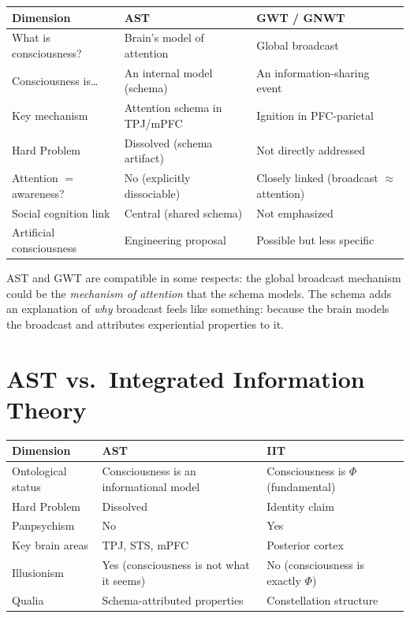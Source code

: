 \documentclass[11pt,a4paper]{report}
\begin{document}
\begin{compbox}
\renewcommand{\arraystretch}{1.4}
\begin{tabular}{>{\raggedright}p{3cm} >{\raggedright}p{5.2cm} >{\raggedright\arraybackslash}p{4.8cm}}
  \toprule
  \textbf{Dimension} & \textbf{AST} & \textbf{GWT / GNWT} \\
  \midrule
  What is consciousness? & Brain's model of attention & Global broadcast \\
  Consciousness is\ldots & An internal model (schema) & An information-sharing event \\
  Key mechanism & Attention schema in TPJ/mPFC & Ignition in PFC-parietal \\
  Hard Problem & Dissolved (schema artifact) & Not directly addressed \\
  Attention $=$ awareness? & No (explicitly dissociable) & Closely linked (broadcast $\approx$ attention) \\
  Social cognition link & Central (shared schema) & Not emphasized \\
  Artificial consciousness & Engineering proposal & Possible but less specific \\
  \bottomrule
\end{tabular}
\end{compbox}

AST and GWT are compatible in some respects: the global broadcast mechanism could be the \emph{mechanism of attention} that the schema models. The schema adds an explanation of \emph{why} broadcast feels like something: because the brain models the broadcast and attributes experiential properties to it.

\section{AST vs.\ Integrated Information Theory}

\begin{compbox}
\renewcommand{\arraystretch}{1.4}
\begin{tabular}{>{\raggedright}p{3cm} >{\raggedright}p{5.2cm} >{\raggedright\arraybackslash}p{4.8cm}}
  \toprule
  \textbf{Dimension} & \textbf{AST} & \textbf{IIT} \\
  \midrule
  Ontological status & Consciousness is an informational model & Consciousness is $\Phi$ (fundamental) \\
  Hard Problem & Dissolved & Identity claim \\
  Panpsychism & No & Yes \\
  Key brain areas & TPJ, STS, mPFC & Posterior cortex \\
  Illusionism & Yes (consciousness is not what it seems) & No (consciousness is exactly $\Phi$) \\
  Qualia & Schema-attributed properties & Constellation structure \\
  \bottomrule
\end{tabular}
\end{compbox}
\end{document}
